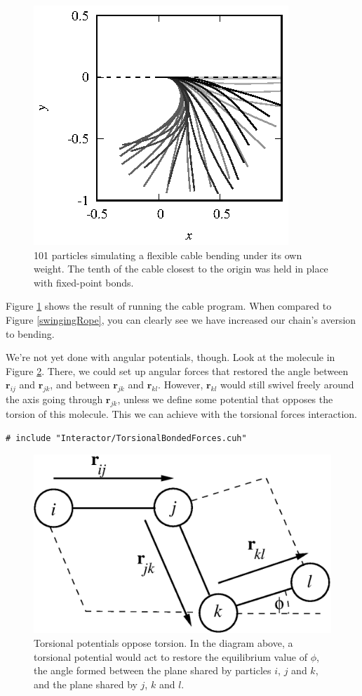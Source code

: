 \begin{figure}
  \centering
  \includegraphics[width = 0.6 \textwidth]{figures/cable.eps}
  \caption{\label{cable}101 particles simulating a flexible cable bending under 
           its own weight. The tenth of the cable closest to the origin was held
           in place with fixed-point bonds.}
\end{figure}

Figure \ref{cable} shows the result of running the cable program. When compared
to Figure \ref{swingingRope}, you can clearly see we have increased our chain's
aversion to bending.

We're not yet done with angular potentials, though. Look at the molecule in 
Figure \ref{torsionalSprings}. There, we could set up angular forces that
restored the angle between $\mathbf{r}_{ij}$ and $\mathbf{r}_{jk}$, and between
$\mathbf{r}_{jk}$ and $\mathbf{r}_{kl}$. However, $\mathbf{r}_{kl}$ would still 
swivel freely around the axis going through $\mathbf{r}_{jk}$, unless we define
some potential that opposes the torsion of this molecule. This we can achieve
with the torsional forces interaction.
\begin{lstlisting}
# include "Interactor/TorsionalBondedForces.cuh"
\end{lstlisting}

\begin{figure}
  \centering
  \includegraphics[width = 0.6 \textwidth]{figures/torsionalSprings.eps}
  \caption{\label{torsionalSprings}Torsional potentials oppose torsion. In the
           diagram above, a torsional potential would act to restore the
           equilibrium value of $\phi$, the angle formed between the plane
           shared by particles $i$, $j$ and $k$, and the plane shared by $j$,
           $k$ and $l$.}
\end{figure}

